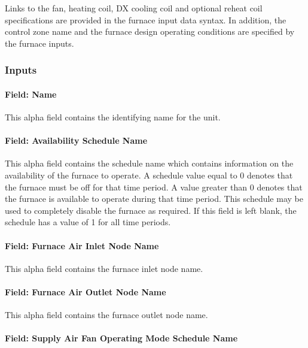 Links to the fan, heating coil, DX cooling coil and optional reheat coil specifications are provided in the furnace input data syntax. In addition, the control zone name and the furnace design operating conditions are specified by the furnace inputs.

\subsubsection{Inputs}\label{inputs-2-043}

\paragraph{Field: Name}\label{field-name-2-040}

This alpha field contains the identifying name for the unit.

\paragraph{Field: Availability Schedule Name}\label{field-availability-schedule-name-1-012}

This alpha field contains the schedule name which contains information on the availability of the furnace to operate. A schedule value equal to 0 denotes that the furnace must be off for that time period. A value greater than 0 denotes that the furnace is available to operate during that time period. This schedule may be used to completely disable the furnace as required. If this field is left blank, the schedule has a value of 1 for all time periods.

\paragraph{Field: Furnace Air Inlet Node Name}\label{field-furnace-air-inlet-node-name}

This alpha field contains the furnace inlet node name.

\paragraph{Field: Furnace Air Outlet Node Name}\label{field-furnace-air-outlet-node-name}

This alpha field contains the furnace outlet node name.

\paragraph{Field: Supply Air Fan Operating Mode Schedule Name}\label{field-supply-air-fan-operating-mode-schedule-name}

